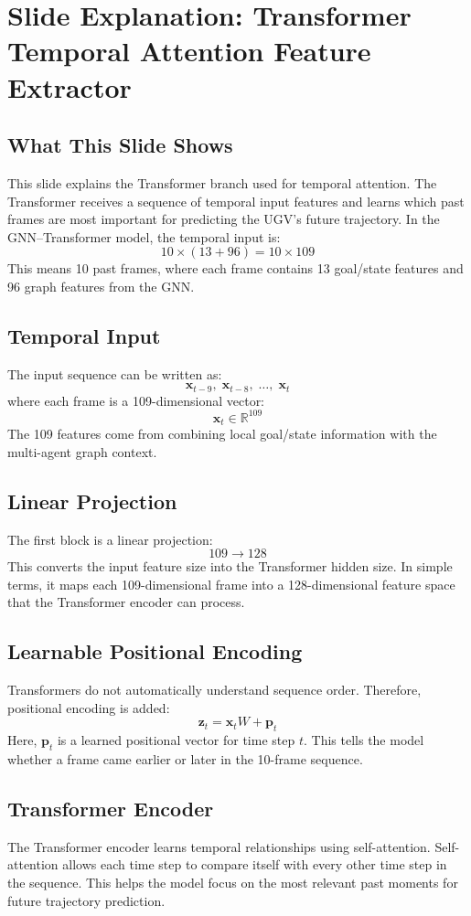 \documentclass[11pt,a4paper]{article}
\begin{document}
\newpage
\section*{Slide Explanation: Transformer Temporal Attention Feature Extractor}

\subsection*{What This Slide Shows}
This slide explains the Transformer branch used for temporal attention. The
Transformer receives a sequence of temporal input features and learns which
past frames are most important for predicting the UGV's future trajectory. In
the GNN--Transformer model, the temporal input is:
\[
    10 \times (13 + 96) = 10 \times 109
\]
This means 10 past frames, where each frame contains 13 goal/state features and
96 graph features from the GNN.

\subsection*{Temporal Input}
The input sequence can be written as:
\[
    \mathbf{x}_{t-9},\; \mathbf{x}_{t-8},\; \ldots,\; \mathbf{x}_{t}
\]
where each frame is a 109-dimensional vector:
\[
    \mathbf{x}_t \in \mathbb{R}^{109}
\]
The 109 features come from combining local goal/state information with the
multi-agent graph context.

\subsection*{Linear Projection}
The first block is a linear projection:
\[
    109 \rightarrow 128
\]
This converts the input feature size into the Transformer hidden size. In
simple terms, it maps each 109-dimensional frame into a 128-dimensional feature
space that the Transformer encoder can process.

\subsection*{Learnable Positional Encoding}
Transformers do not automatically understand sequence order. Therefore,
positional encoding is added:
\[
    \mathbf{z}_t = \mathbf{x}_t W + \mathbf{p}_t
\]
Here, \(\mathbf{p}_t\) is a learned positional vector for time step \(t\). This
tells the model whether a frame came earlier or later in the 10-frame sequence.

\subsection*{Transformer Encoder}
The Transformer encoder learns temporal relationships using self-attention.
Self-attention allows each time step to compare itself with every other time
step in the sequence. This helps the model focus on the most relevant past
moments for future trajectory prediction.
\end{document}
